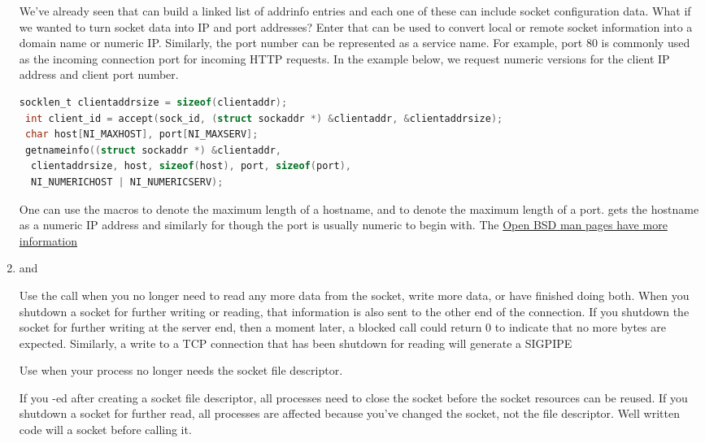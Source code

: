 \begin{enumerate}
  We've already seen  that can build a linked list of addrinfo entries and each one of these can include socket configuration data.
  What if we wanted to turn socket data into IP and port addresses?
  Enter  that can be used to convert local or remote socket information into a domain name or numeric IP.
  Similarly, the port number can be represented as a service name.
  For example, port 80 is commonly used as the incoming connection port for incoming HTTP requests.
  In the example below, we request numeric versions for the client IP address and client port number.

  \begin{lstlisting}[language=C]
 socklen_t clientaddrsize = sizeof(clientaddr);
 int client_id = accept(sock_id, (struct sockaddr *) &clientaddr, &clientaddrsize);
 char host[NI_MAXHOST], port[NI_MAXSERV];
 getnameinfo((struct sockaddr *) &clientaddr,
  clientaddrsize, host, sizeof(host), port, sizeof(port),
  NI_NUMERICHOST | NI_NUMERICSERV);
  \end{lstlisting}

  One can use the macros  to denote the maximum length of a hostname, and  to denote the maximum length of a port.
   gets the hostname as a numeric IP address and similarly for  though the port is usually numeric to begin with.
  The \href{https://man.openbsd.org/getnameinfo.3#NI\_NUMERICHOST}{Open BSD man pages have more information}

  \item {} and 

  Use the  call when you no longer need to read any more data from the socket, write more data, or have finished doing both.
  When you shutdown a socket for further writing or reading, that information is also sent to the other end of the connection.
  If you shutdown the socket for further writing at the server end, then a moment later, a blocked  call could return 0 to indicate that no more bytes are expected.
  Similarly, a write to a TCP connection that has been shutdown for reading will generate a SIGPIPE

  Use  when your process no longer needs the socket file descriptor.

  If you -ed after creating a socket file descriptor, all processes need to close the socket before the socket resources can be reused.
  If you shutdown a socket for further read, all processes are affected because you've changed the socket, not the file descriptor.
  Well written code will  a socket before calling  it.

\end{enumerate}

